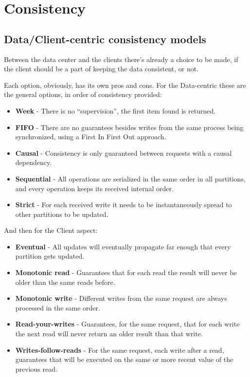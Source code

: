 \documentclass[14pt,oneside]{extreport}
\newcommand*\fpar{\hspace{1ex}}
\begin{document}
  \section{Consistency}
    \subsection{Data/Client-centric consistency models}
    \fpar Between the data center and the clients there's already a choice to be made, if the client should be a part of keeping the data consistent, or not.
    \par Each option, obviously, has its own pros and cons. For the Data-centric these are the general options, in order of consistency provided:
    \begin{itemize}[noitemsep]
      \item \textbf{Week} - There is no “supervision”, the first item found is returned.
      \item \textbf{FIFO} - There are no guarantees besides writes from the same process being synchronized, using a First In First Out approach.
      \item \textbf{Causal} - Consistency is only guaranteed between requests with a causal dependency.
      \item \textbf{Sequential} - All operations are serialized in the same order in all partitions, and every operation keeps its received internal order.
      \item \textbf{Strict} - For each received write it needs to be instantaneously spread to other partitions to be updated.
    \end{itemize}
    \par And then for the Client aspect:
    \begin{itemize}[noitemsep]
      \item \textbf{Eventual} - All updates will eventually propagate far enough that every partition gets updated.
      \item \textbf{Monotonic read} - Guarantees that for each read the result will never be older than the same reads before.
      \item \textbf{Monotonic write} - Different writes from the same request are always processed in the same order.
      \item \textbf{Read-your-writes} - Guarantees, for the same request, that for each write the next read will never return an older result than that write.
      \item \textbf{Writes-follow-reads} - For the same request, each write after a read, guarantees that will be executed on the same or more recent value of the previous read.
    \end{itemize}
\end{document}
